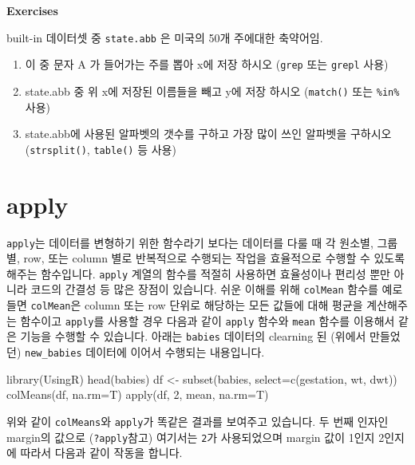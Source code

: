\documentclass[
  a4paper,
]{book}
\newenvironment{Shaded}{\begin{snugshade}}{\end{snugshade}}
\newcommand{\AttributeTok}[1]{\textcolor[rgb]{0.40,0.45,0.13}{#1}}
\newcommand{\DecValTok}[1]{\textcolor[rgb]{0.68,0.00,0.00}{#1}}
\newcommand{\FunctionTok}[1]{\textcolor[rgb]{0.28,0.35,0.67}{#1}}
\newcommand{\NormalTok}[1]{\textcolor[rgb]{0.00,0.23,0.31}{#1}}
\newcommand{\OtherTok}[1]{\textcolor[rgb]{0.00,0.23,0.31}{#1}}
\begin{document}
\textbf{Exercises}

built-in 데이터셋 중 \texttt{state.abb} 은 미국의 50개 주에대한
축약어임.

\begin{enumerate}
\def\labelenumi{\arabic{enumi})}
\item
  이 중 문자 A 가 들어가는 주를 뽑아 x에 저장 하시오 (\texttt{grep} 또는
  \texttt{grepl} 사용)
\item
  state.abb 중 위 x에 저장된 이름들을 빼고 y에 저장 하시오
  (\texttt{match()} 또는 \texttt{\%in\%}사용)
\item
  state.abb에 사용된 알파벳의 갯수를 구하고 가장 많이 쓰인 알파벳을
  구하시오 (\texttt{strsplit()}, \texttt{table()} 등 사용)
\end{enumerate}

\hypertarget{apply}{%
\section{apply}\label{apply}}

\texttt{apply}는 데이터를 변형하기 위한 함수라기 보다는 데이터를 다룰 때
각 원소별, 그룹별, row, 또는 column 별로 반복적으로 수행되는 작업을
효율적으로 수행할 수 있도록 해주는 함수입니다. \texttt{apply} 계열의
함수를 적절히 사용하면 효율성이나 편리성 뿐만 아니라 코드의 간결성 등
많은 장점이 있습니다. 쉬운 이해를 위해 \texttt{colMean} 함수를 예로 들면
\texttt{colMean}은 column 또는 row 단위로 해당하는 모든 값들에 대해
평균을 계산해주는 함수이고 \texttt{apply}를 사용할 경우 다음과 같이
\texttt{apply} 함수와 \texttt{mean} 함수를 이용해서 같은 기능을 수행할
수 있습니다. 아래는 \texttt{babies} 데이터의 clearning 된 (위에서
만들었던) \texttt{new\_babies} 데이터에 이어서 수행되는 내용입니다.

\begin{Shaded}
\begin{Highlighting}[]
\FunctionTok{library}\NormalTok{(UsingR)}
\FunctionTok{head}\NormalTok{(babies)}
\NormalTok{df }\OtherTok{\textless{}{-}} \FunctionTok{subset}\NormalTok{(babies, }\AttributeTok{select=}\FunctionTok{c}\NormalTok{(gestation, wt, dwt))}
\FunctionTok{colMeans}\NormalTok{(df, }\AttributeTok{na.rm=}\NormalTok{T)}
\FunctionTok{apply}\NormalTok{(df, }\DecValTok{2}\NormalTok{, mean, }\AttributeTok{na.rm=}\NormalTok{T)}
\end{Highlighting}
\end{Shaded}

위와 같이 \texttt{colMeans}와 \texttt{apply}가 똑같은 결과를 보여주고
있습니다. 두 번째 인자인 margin의 값으로 (\texttt{?apply}참고) 여기서는
\texttt{2}가 사용되었으며 margin 값이 1인지 2인지에 따라서 다음과 같이
작동을 합니다.
\end{document}
